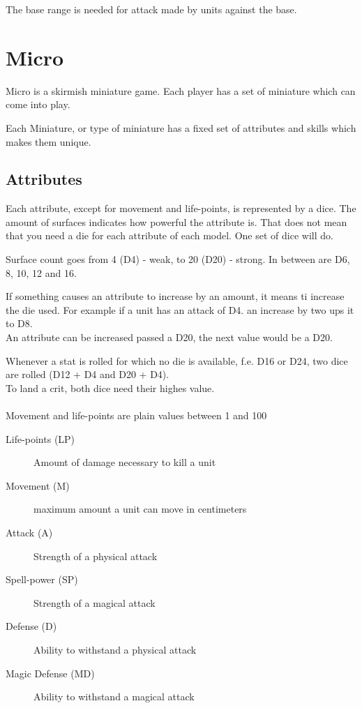 \documentclass[a5paper,pagesize,10pt,bibtotoc,pointlessnumbers,
normalheadings,DIV=9,twoside=false]{scrbook}
\begin{document}
The base range is needed for attack made by units against the base.


\chapter{Micro}

Micro is a skirmish miniature game. Each player has a set of miniature which can come into play.

Each Miniature, or type of miniature has a fixed set of attributes and skills which makes them unique.

\section{Attributes}
Each attribute, except for movement and life-points, is represented by a dice. The amount of surfaces indicates how powerful the attribute is.
That does not mean that you need a die for each attribute of each model. One set of dice will do.

Surface count goes from 4 (D4) - weak, to 20 (D20) - strong. In between are D6, 8, 10, 12 and 16.

If something causes an attribute to increase by an amount, it means ti increase the die used. For example if a unit has an attack of D4. an increase by two ups it to D8.\\
An attribute can be increased passed a D20, the next value would be a D20.

Whenever a stat is rolled for which no die is available, f.e. D16 or D24, two dice are rolled (D12 + D4 and D20 + D4).\\
To land a crit, both dice need their highes value.\\
\\
Movement and life-points are plain values between 1 and 100

\begin{description}
\item[Life-points (LP)]
Amount of damage necessary to kill a unit
\item[Movement (M)]
maximum amount a unit can move in centimeters
\item[Attack (A)]
Strength of a physical attack
\item[Spell-power (SP)]
Strength of a magical attack
\item[Defense (D)]
Ability to withstand a physical attack
\item[Magic Defense (MD)]
Ability to withstand a magical attack
\end{description}
\end{document}
